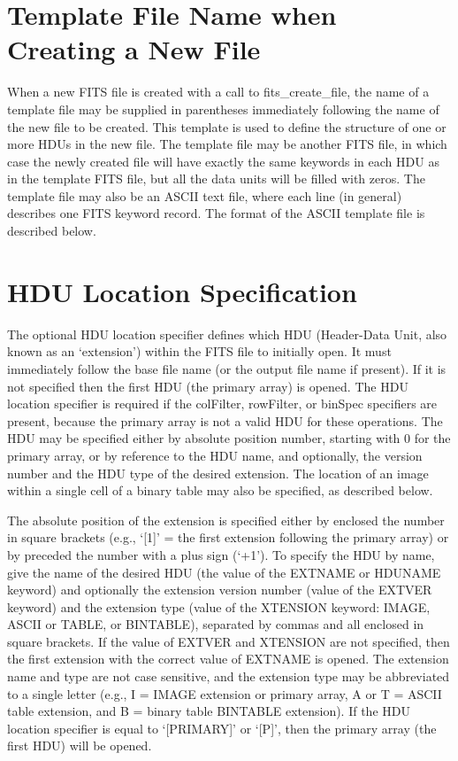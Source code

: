 \documentclass[11pt]{book}
\begin{document}
\section{Template File Name when Creating a New File}

When a new FITS file is created with a call to fits\_create\_file, the
name of a template file may be supplied in parentheses immediately
following the name of the new file to be created.  This template is
used to define the structure of one or more HDUs in the new file.  The
template file may be another FITS file, in which case the newly created
file will have exactly the same keywords in each HDU as in the template
FITS file, but all the data units will be filled with zeros.  The
template file may also be an ASCII text file, where each line (in
general) describes one FITS keyword record.  The format of the ASCII
template file is described below.


\section{HDU Location Specification}

The optional HDU location specifier defines which HDU (Header-Data
Unit, also known as an `extension') within the FITS file to initially
open.  It must immediately follow the base file name (or the output
file name if present).  If it is not specified then the first HDU (the
primary array) is opened.  The HDU location specifier is required if
the colFilter, rowFilter, or binSpec specifiers are present, because
the primary array is not a valid HDU for these operations. The HDU may
be specified either by absolute position number, starting with 0 for
the primary array, or by reference to the HDU name, and optionally, the
version number and the HDU type of the desired extension.  The location
of an image within a single cell of a binary table may also be
specified, as described below.

The absolute position of the extension is specified either by enclosed
the number in square brackets (e.g., `[1]' = the first extension
following the primary array) or by preceded the number with a plus sign
(`+1').  To specify the HDU by name, give the name of the desired HDU
(the value of the EXTNAME or HDUNAME keyword) and optionally the
extension version number (value of the EXTVER keyword) and the
extension type (value of the XTENSION keyword: IMAGE, ASCII or TABLE,
or BINTABLE), separated by commas and all enclosed in square brackets.
If the value of EXTVER and XTENSION are not specified, then the first
extension with the correct value of EXTNAME is opened. The extension
name and type are not case sensitive, and the extension type may be
abbreviated to a single letter (e.g., I = IMAGE extension or primary
array, A or T = ASCII table extension, and B = binary table BINTABLE
extension).   If the HDU location specifier is equal to `[PRIMARY]' or
`[P]', then the primary array (the first HDU) will be opened.
\end{document}
